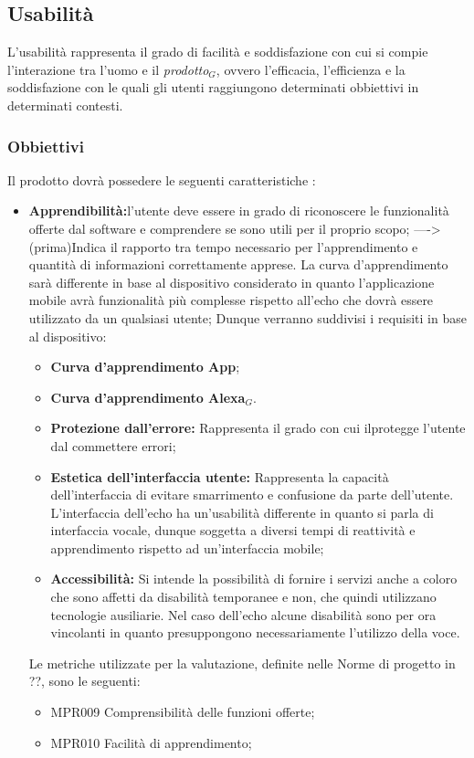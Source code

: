 \subsection{Usabilità}
L'usabilità rappresenta il grado di facilità e soddisfazione con cui si compie l'interazione tra l'uomo e il \textit{prodotto$_{G}$}, ovvero l'efficacia, l'efficienza e la soddisfazione con le quali gli utenti raggiungono determinati obbiettivi in determinati contesti.
\subsubsection{Obbiettivi } Il prodotto dovrà possedere le seguenti caratteristiche :
\begin{itemize}
	\item \textbf{Apprendibilità:}l'utente deve essere in grado di riconoscere le funzionalità offerte dal software e comprendere se sono utili per il proprio scopo; ---->(prima)Indica il rapporto tra tempo necessario per l'apprendimento e quantità di informazioni correttamente apprese.
	La curva d'apprendimento sarà differente in base al dispositivo considerato in quanto l'applicazione mobile avrà funzionalità più complesse rispetto all'echo che dovrà essere utilizzato da un qualsiasi utente; Dunque verranno suddivisi i requisiti in base al dispositivo:
	\begin{itemize}
		\item \textbf{Curva d'apprendimento App};
		\item \textbf{Curva d'apprendimento Alexa$_{G}$}.
		\item \textbf{Protezione dall'errore:} Rappresenta il grado con cui ilprotegge l'utente dal commettere errori;
		\item \textbf{Estetica dell'interfaccia utente:} Rappresenta la capacità dell'interfaccia di evitare smarrimento e confusione da parte dell'utente.
		L'interfaccia dell'echo ha un'usabilità differente in quanto si parla di interfaccia vocale, dunque soggetta a diversi tempi di reattività e apprendimento rispetto ad un'interfaccia mobile;
		\item \textbf{Accessibilità:} Si intende la possibilità di fornire i servizi anche a coloro che sono affetti da disabilità temporanee e non, che quindi utilizzano tecnologie ausiliarie.
		Nel caso dell'echo alcune disabilità sono per ora vincolanti in quanto presuppongono necessariamente l'utilizzo della voce.
	\end{itemize}
	Le metriche utilizzate per la valutazione, definite nelle Norme di progetto in ??, sono le seguenti:
	\begin{itemize}
		\item MPR009 Comprensibilità delle funzioni offerte;
		\item MPR010 Facilità di apprendimento;
	\end{itemize}
\end{itemize}

